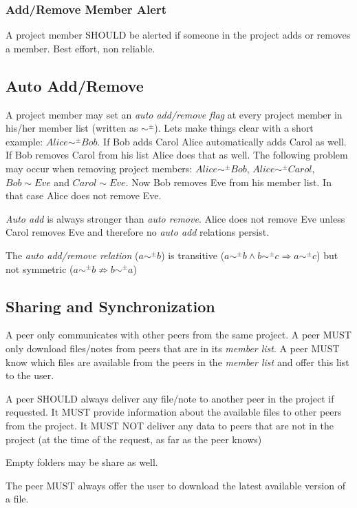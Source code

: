 \subsubsection{Add/Remove Member Alert}
A project member SHOULD be alerted if someone in the project adds or removes a member. Best effort, non reliable. 

\subsection{Auto Add/Remove}
A project member may set an \emph{auto add/remove flag} at every project member in his/her member list (written as $\sim ^\pm$). Lets make things clear with a short example: $Alice \sim ^\pm Bob$. If Bob adds Carol Alice automatically adds Carol as well. If Bob removes Carol from his list Alice does that as well. The following problem may occur when removing project members: $Alice \sim ^\pm Bob$, $Alice \sim ^\pm  Carol$, $Bob \sim Eve$ and $Carol \sim Eve$. Now Bob removes Eve from his member list. In that case Alice does not remove Eve. 

\emph{Auto add} is always stronger than \emph{auto remove}. Alice does not remove Eve unless Carol removes Eve and therefore no \emph{auto add} relations persist. 

The \emph{auto add/remove relation} ($a \sim ^\pm b$) is transitive ($a \sim ^\pm b \wedge b\sim ^\pm c \Rightarrow a \sim ^\pm c$) but not symmetric ($a \sim ^\pm b \not\Rightarrow b \sim ^\pm a$)

\subsection{Sharing and Synchronization}
A peer only communicates with other peers from the same project. A peer MUST only download files/notes from peers that are in its \emph{member list}. A peer MUST know which files are available from the peers in the \emph{member list} and offer this list to the user.

A peer SHOULD always deliver any file/note to another peer in the project if requested. It MUST provide information about the available files to other peers from the project. It MUST NOT deliver any data to peers that are not in the project (at the time of the request, as far as the peer knows)

Empty folders may be share as well.

The peer MUST always offer the user to download the latest available version of a file.

